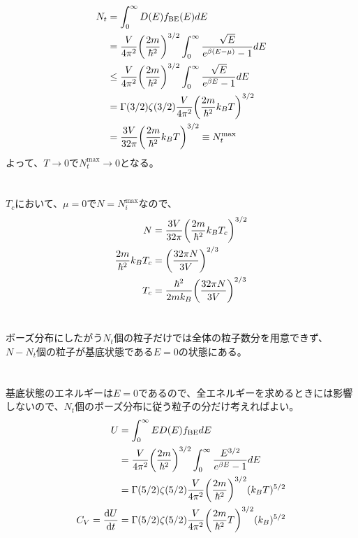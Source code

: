 \documentclass[../ap_2013.tex]{subfiles}
\begin{document}
\section{}
\begin{equation}\begin{aligned}[b]
    N_t &= \int_0^\infty D(E)f_\text{BE}(E)dE\\
    &= \frac{V}{4\pi^2}\qty(\frac{2m}{\hbar^2})^{3/2}\int_0^\infty \frac{\sqrt{E}}{e^{\beta(E-\mu)}-1}dE\\
    &\leq \frac{V}{4\pi^2}\qty(\frac{2m}{\hbar^2})^{3/2}\int_0^\infty \frac{\sqrt{E}}{e^{\beta E}-1}dE\\
    &=\Gamma(3/2)\zeta(3/2)\frac{V}{4\pi^2}\qty(\frac{2m}{\hbar^2}k_BT)^{3/2}\\
    &=\frac{3V}{32\pi}\qty(\frac{2m}{\hbar^2}k_BT)^{3/2}\equiv N_t^\text{max}
\end{aligned}\end{equation}
よって、\(T\to0\)で\(N_t^\text{max}\to 0\)となる。

\section{}
\(T_c\)において、\(\mu=0\)で\(N=N_i^\text{max}\)なので、
\begin{equation}\begin{aligned}[b]
    N &=\frac{3V}{32\pi}\qty(\frac{2m}{\hbar^2}k_BT_c)^{3/2}\\
    \frac{2m}{\hbar^2}k_BT_c &= \qty(\frac{32\pi N}{3V})^{2/3}\\
    T_c &= \frac{\hbar^2}{2mk_B}\qty(\frac{32\pi N}{3V})^{2/3}
\end{aligned}\end{equation}

\section{}
ボーズ分布にしたがう\(N_t\)個の粒子だけでは全体の粒子数分を用意できず、
\(N-N_t\)個の粒子が基底状態である\(E=0\)の状態にある。

\section{}
基底状態のエネルギーは\(E=0\)であるので、全エネルギーを求めるときには影響しないので、\(N_t\)個のボーズ分布に従う粒子の分だけ考えればよい。
\begin{equation}\begin{aligned}[b]
    U &= \int_0^\infty ED(E)f_\text{BE}dE\\
    &=\frac{V}{4\pi^2}\qty(\frac{2m}{\hbar^2})^{3/2}\int_0^\infty \frac{E^{3/2}}{e^{\beta E}-1}dE\\
    &=\Gamma(5/2)\zeta(5/2)\frac{V}{4\pi^2}\qty(\frac{2m}{\hbar^2})^{3/2}(k_BT)^{5/2}\\
    C_V=\dv{U}{t}&=
    \Gamma(5/2)\zeta(5/2)\frac{V}{4\pi^2}\qty(\frac{2m}{\hbar^2}T)^{3/2}(k_B)^{5/2}
\end{aligned}\end{equation}
\end{document}
